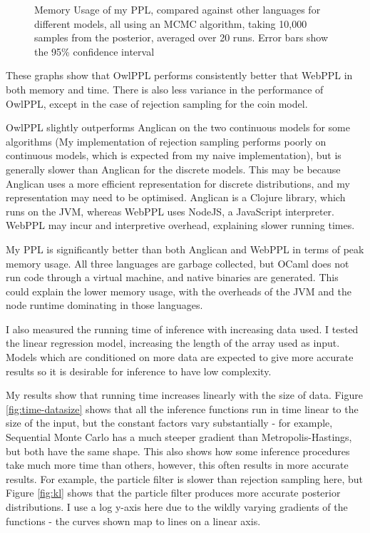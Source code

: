 \documentclass[sigconf]{acmart}
\begin{document}
\begin{figure}[!ht]
  \centering
  
  \caption{Memory Usage of my PPL, compared against other languages for different models, all using an MCMC algorithm, taking 10,000 samples from the posterior, averaged over 20 runs. Error bars show the 95\% confidence interval}
  \label{fig:mem-perf}
\end{figure}

These graphs show that OwlPPL performs consistently better that WebPPL in both memory and time. There is also less variance in the performance of OwlPPL, except in the case of rejection sampling for the coin model.

OwlPPL slightly outperforms Anglican on the two continuous models for some algorithms (My implementation of rejection sampling performs poorly on continuous models, which is expected from my naive implementation), but is generally slower than Anglican for the discrete models. This may be because Anglican uses a more efficient representation for discrete distributions, and my representation may need to be optimised. Anglican is a Clojure library, which runs on the JVM, whereas WebPPL uses NodeJS, a JavaScript interpreter.  WebPPL may incur and interpretive overhead, explaining slower running times.

My PPL is significantly better than both Anglican and WebPPL in terms of peak memory usage. All three languages are garbage collected, but OCaml does not run code through a virtual machine, and native binaries are generated. This could explain the lower memory usage, with the overheads of the JVM and the node runtime dominating in those languages.

I also measured the running time of inference with increasing data used. I tested the linear regression model, increasing the length of the array used as input. Models which are conditioned on more data are expected to give more accurate results so it is desirable for inference to have low complexity.

My results show that running time increases linearly with the size of data. Figure \ref{fig:time-datasize} shows that all the inference functions run in time linear to the size of the input, but the constant factors vary substantially - for example, Sequential Monte Carlo has a much steeper gradient than Metropolis-Hastings, but both have the same shape. This also shows how some inference procedures take much more time than others, however, this often results in more accurate results. For example, the particle filter is slower than rejection sampling here, but Figure \ref{fig:kl} shows that the particle filter produces more accurate posterior distributions. I use a log y-axis here due to the wildly varying gradients of the functions - the curves shown map to lines on a linear axis.
\end{document}

